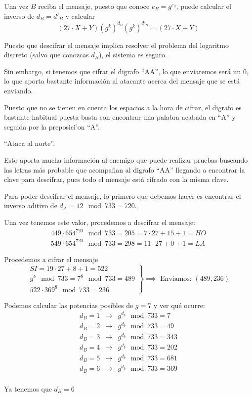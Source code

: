 \begin{problem}[2]
Una vez $B$ reciba el mensaje, puesto que conoce $e_B=g^{e_d}$, puede calcular el inverso de $d_B=d'_B$ y calcular
\[(27\cdot X + Y)(g^k)^{d_B}(g^k)^{d'_B}=(27\cdot X +Y)\]

Puesto que descifrar el mensaje implica resolver el problema del logaritmo discreto (salvo que conozcas $d_B$), el sistema es seguro.

Sin embargo, si tenemos que cifrar el digrafo ``AA'', lo que enviaremos será un 0, lo que aporta bastante información al atacante acerca del mensaje que se está enviando.

Puesto que no se tienen en cuenta los espacios a la hora de cifrar, el digrafo es bastante habitual puesta basta con encontrar una palabra acabada en ``A'' y seguida por la preposici'on ``A''.

``Ataca al norte''.

Esto aporta mucha información al enemigo que puede realizar pruebas buscando las letras más probable que acompañan al digrafo ``AA'' llegando a encontrar la clave para descifrar, pues todo el mensaje está cifrado con la misma clave.

\spart
Para poder descifrar el mensaje, lo primero que debemos hacer es encontrar el inverso aditivo de $d_A=12 \mod  733 = 720$.

Una vez tenemos este valor, procedemos a descifrar el mensaje:
\[\begin{array}{l}
449 \cdot 654^{720} \mod 733 = 205 = 7\cdot 27 + 15 + 1 = HO\\
549 \cdot 654^{720} \mod 733 = 298 = 11 \cdot 27 + 0 + 1 = LA
\end{array}\]

\spart
Procedemos a cifrar el mensaje
\[\left.\begin{array}{l}
SI = 19 \cdot 27 + 8 +1 = 522\\
g^k \mod 733 = 7^8 \mod 733 = 489 \\
522 \cdot 369^{8} \mod 733 =236 
\end{array}\right\}\implies \text{ Enviamos: } (489,236) \]

\spart 

Podemos calcular las potencias posibles de $g=7$ y ver qué ocurre:
\[\begin{array}{lcl}
d_B=1 & \to & g^{d_b} \mod 733= 7\\
d_B=2 & \to & g^{d_b} \mod 733= 49\\
d_B=3 & \to & g^{d_b} \mod 733= 343\\
d_B=4 & \to & g^{d_b} \mod 733= 202\\
d_B=5 & \to & g^{d_b} \mod 733= 681\\
d_B=6 & \to & g^{d_b} \mod 733= 369\\
\end{array}\]

Ya tenemos que $d_B=6$

\end{problem}


